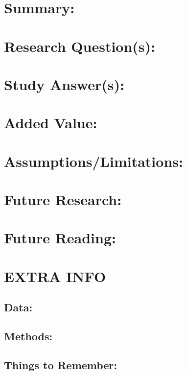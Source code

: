 \documentclass[a4paper]{article}
\begin{document}



\section*{Summary:} %



\section*{Research Question(s):}



\section*{Study Answer(s):}



\section*{Added Value:}



\section*{Assumptions/Limitations:}



\section*{Future Research:}



\section*{Future Reading:}

\citealt{}
 
\section*{EXTRA INFO}



\subsection*{Data:}



\subsection*{Methods:}



\subsection*{Things to Remember:}


\end{document}
